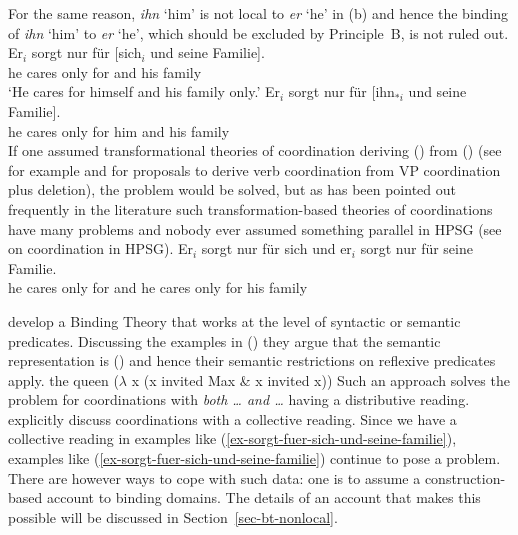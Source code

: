 \documentclass[output=paper
	        ,collection
	        ,collectionchapter
 	        ,biblatex
                ,babelshorthands
                ,newtxmath
                ,draftmode
                ,colorlinks, citecolor=brown
]{langscibook}
\begin{document}
For the same reason, \emph{ihn} `him' is not local to \emph{er} `he' in (b) and hence the
binding of \emph{ihn} `him' to \emph{er} `he', which should be excluded by Principle~B, is not ruled out.
\eal
\label{ex-sorgt-fuer-sich-und-seine-familie}
\ex
\gll Er$_{i}$ sorgt nur für [sich$_{i}$ und seine Familie].\\
     he      cares only for \spacebr{}\self{} and his family\\
\glt `He cares for himself and his family only.'
\ex 
\gll Er$_{i}$ sorgt nur für [ihn$_{*i}$ und seine Familie].\\
     he      cares only for \spacebr{}him and his family\\
\zl
If one assumed transformational theories of coordination deriving () from () (see for example
\citealp[]{WC80a-u} and \citealp[, 67]{Kayne94a-u} for proposals to derive verb
coordination from VP coordination plus deletion), the problem would be solved, but as has been
pointed out frequently in the literature such transformation-based theories of coordinations have
many problems \parencites[]{BV72}[--193]{Jackendoff77a}[]{Dowty79a}[--105]{denBesten83a}{Klein85}{Eisenberg94a}[]{Borsley2005a} and nobody ever assumed
something parallel in HPSG (see  on coordination in HPSG).
\ea
\gll Er$_{i}$ sorgt nur für sich     und er$_{i}$ sorgt nur für seine Familie.\\
     he      cares only for \self{} and he       cares only for his family\\
\z

\citet{RR93a} develop a Binding Theory that works at the level of syntactic or semantic
predicates. Discussing the examples in () they argue that the semantic representation is
() and hence their semantic restrictions on reflexive predicates apply.
\eal
{}
\zl
\ea
the queen ($\lambda$ x (x invited Max \& x invited x))
\z
Such an approach solves the problem for coordinations with \emph{both \ldots{} and \ldots} having a
distributive reading. \citet[]{RR93a} explicitly discuss coordinations with a collective
reading. Since we have a collective reading in examples like
(\ref{ex-sorgt-fuer-sich-und-seine-familie}), examples like (\ref{ex-sorgt-fuer-sich-und-seine-familie}) continue to pose a problem. There are
however ways to cope with such data: one is to assume a construction-based account to binding
domains. The details of an account that makes this possible will be discussed in Section~\ref{sec-bt-nonlocal}.
\end{document}
